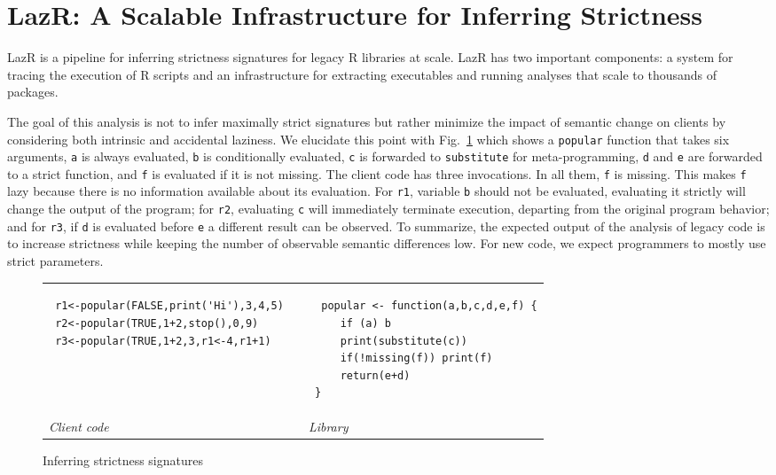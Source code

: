 \documentclass[review,creen,acmsmall]{acmart}
\renewcommand{\c}[1]{\lstinline |#1|\xspace}
\newcommand{\lazr}{{\sf LazR}\xspace}
\begin{document}
\section{LazR: A Scalable Infrastructure for Inferring Strictness}\label{sec:lazr}

\lazr is a pipeline for inferring strictness signatures for legacy R libraries
at scale. \lazr has two important components: a system for tracing the execution
of R scripts and an infrastructure for extracting executables and running
analyses that scale to thousands of packages.


The goal of this analysis is not to infer maximally strict signatures but rather
minimize the impact of semantic change on clients by considering both intrinsic
and accidental laziness. We elucidate this point with Fig.~\ref{iss} which
shows a \c{popular} function that takes six arguments, \c{a} is always
evaluated, \c{b} is conditionally evaluated, \c{c} is forwarded to
\c{substitute} for meta-programming, \c{d} and \c{e} are forwarded to a
strict function, and \c{f} is evaluated if it is not missing. The client code
has three invocations. In all them, \c{f} is missing. This makes \c{f}
lazy because there is no information available about its evaluation. For \c{r1},
variable \c b should not be evaluated, evaluating it strictly will change the
output of the program; for \c{r2}, evaluating \c{c} will immediately
terminate execution, departing from the original program behavior; and for
\c{r3}, if \c{d} is evaluated before \c{e} a different result can be observed.
To summarize, the expected output of the analysis of legacy code is to increase
strictness while keeping the number of observable semantic differences low. For
new code, we expect programmers to mostly use strict parameters.

\begin{figure}[!h]
  \begin{tabular}{lll}
    \begin{minipage}{6cm}
\begin{lstlisting}
 r1<-popular(FALSE,print('Hi'),3,4,5)
 r2<-popular(TRUE,1+2,stop(),0,9)
 r3<-popular(TRUE,1+2,3,r1<-4,r1+1)
\end{lstlisting}
    \end{minipage}
    &&
       \begin{minipage}{6cm}
\begin{lstlisting}
  popular <- function(a,b,c,d,e,f) {
     if (a) b
     print(substitute(c))
     if(!missing(f)) print(f)
     return(e+d)
 }
\end{lstlisting}
       \end{minipage}\\
{\it Client code}&& {\it Library}
  \end{tabular}%
  \caption{Inferring strictness signatures}\label{iss} %
\end{figure}
\end{document}

